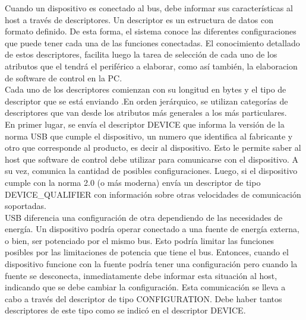 %

Cuando un dispositivo es conectado al bus, debe informar sus características al host a través de descriptores. Un descriptor es un estructura de datos con formato definido. De esta forma, el sistema conoce las diferentes configuraciones que puede tener cada una de las funciones conectadas. El conocimiento detallado de estos descriptores, facilita luego la tarea de selección de cada uno de los atributos que el tendrá el periférico a elaborar, como así también, la elaboracion de software de control en la PC.\\

Cada uno de los descriptores comienzan con su longitud en bytes y el tipo de descriptor que se está enviando .En orden jerárquico, se utilizan categorías de descriptores que van desde los atributos más generales a los más particulares.\\

En primer lugar, se envía el descriptor DEVICE que informa la versión de la norma USB que cumple el dispositivo, un numero que identifica al fabricante y otro que corresponde al producto, es decir al dispositivo. Esto le permite saber al host que software de control debe utilizar para comunicarse con el dispositivo. A su vez, comunica la cantidad de posibles configuraciones. Luego, si el dispositivo cumple con la norma 2.0 (o más moderna) envía un descriptor de tipo DEVICE\_QUALIFIER con información sobre otras velocidades de comunicación soportadas.\\

USB diferencia una configuración de otra dependiendo de las necesidades de energía. Un dispositivo podría operar conectado a una fuente de energía externa, o bien, ser potenciado por el mismo bus. Esto podría limitar las funciones posibles por las limitaciones de potencia que tiene el bus. Entonces, cuando el dispositivo funcione con la fuente podría tener una configuración pero cuando la fuente se desconecta, inmediatamente debe informar esta situación al host, indicando que se debe cambiar la configuración. Esta comunicación se lleva a cabo a través del descriptor de tipo CONFIGURATION. Debe haber tantos descriptores de este tipo como se indicó en el descriptor DEVICE.\\

